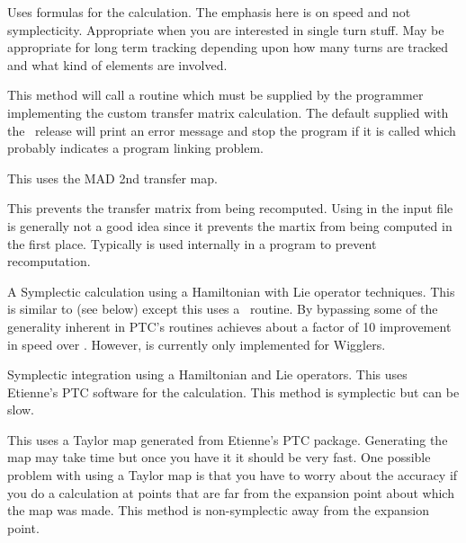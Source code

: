 \begin{description}

\item[\vn{Bmad\_Standard}]
Uses formulas for the calculation. The emphasis here is on speed and not
symplecticity. Appropriate when you are interested in single turn
stuff. May be appropriate for long term tracking depending upon how
many turns are tracked and what kind of elements are involved. 

\item[\vn{Custom}]
This method will call a routine  which must be
supplied by the programmer implementing the custom transfer matrix
calculation. The default  supplied with the
\bmad\ release will print an error message and stop the program if it
is called which probably indicates a program linking problem.

\item[\vn{MAD}]
This uses the MAD 2nd transfer map.

\item[\vn{None}]
This prevents the transfer matrix from being recomputed.
Using  in the input file is generally not a good idea since
it prevents the martix from being computed in the first place.
Typically  is used internally in a program to prevent recomputation.

\item[\vn{Symp\_Lie\_Bmad}]
A Symplectic calculation using a Hamiltonian with Lie operator techniques.
This is similar to  (see below) except this uses a
\bmad\ routine. By bypassing some of the generality inherent in PTC's routines
 achieves about a factor of 10 improvement in speed over
. However,  is
currently only implemented for Wigglers.

\item[\vn{Symp\_Lie\_PTC}]
Symplectic integration using a Hamiltonian and Lie operators.
This uses Etienne's PTC software for the calculation.
This method is symplectic but can be slow.

\item[\vn{Taylor}]
This uses a Taylor map generated from Etienne's PTC
package. Generating the map may take time but once you have it it
should be very fast. One possible problem with using a Taylor map is
that you have to worry about the accuracy if you do a calculation at points
that are far from the expansion point about which the map was
made. This method is non-symplectic away from the expansion point. 


\end{description}
